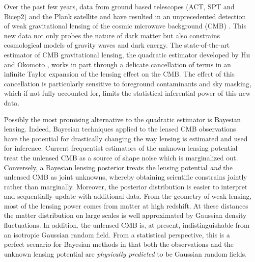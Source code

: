 \documentclass[noinfoline]{imsart}
\begin{document}
 Over the past few years, data from ground based telescopes (ACT, SPT and Bicep2) and the Plank satellite and have resulted in an unprecedented detection of weak gravitational lensing of the cosmic microwave background (CMB) \cite{das2011detection,van2012measurement,ade2013planck}.  This new data not only probes the nature of dark matter but also constrains cosmological models of gravity waves and dark energy. The state-of-the-art estimator of CMB gravitational lensing, the quadratic estimator developed by Hu and Okomoto \cite{hu2001mapping,hu2002mass}, works in part through a delicate cancellation of terms in an infinite Taylor expansion of the lensing effect on the CMB. The effect of this cancellation is particularly sensitive to foreground contaminants and sky masking, which  if not fully accounted for,  limits  the statistical inferential power of this new data.  

 Possibly the most promising alternative to the quadratic estimator is Bayesian lensing. Indeed, Bayesian techniques applied to the lensed CMB observations have the potential for drastically changing the way lensing is estimated and used for inference.  Current frequentist estimators of the unknown lensing potential treat the unlensed CMB as a source of shape noise which is marginalized out. Conversely, a Bayesian lensing posterior treats the lensing potential {\em and} the unlensed CMB as joint unknowns, whereby obtaining scientific constrains jointly rather than marginally. Moreover, the  posterior distribution is easier to interpret and sequentially update with additional data. From the geometry of weak lensing, most of the lensing power comes from matter at high redshift. At these distances the matter distribution on large scales is well approximated by Gaussian density fluctuations. In addition, the unlensed CMB is, at present, indistinguishable from an isotropic Gaussian random field.  From a statistical perspective, this is a perfect scenario for Bayesian methods in that both the observations and the unknown lensing potential are {\em physically predicted} to be Gaussian random fields.  
 
\end{document}
